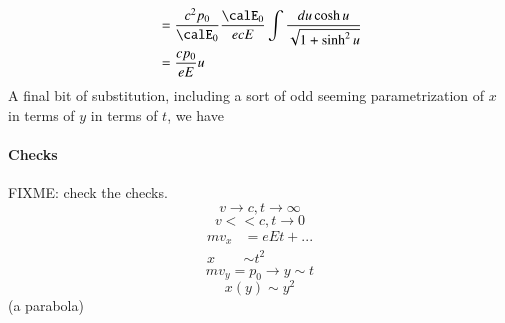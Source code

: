 {\begin{equation}
\begin{aligned}
&= \frac{c^2 p_0}{\calE_0}
\frac{\calE_0}{ e c E}
\int \frac{ du \cosh u }{\sqrt{1 + \sinh^2 u }} \\
&= \frac{c p_0}{ e E} u
\end{aligned}
\end{equation}
%
A final bit of substitution, including a sort of odd seeming parametrization of \(x\) in terms of \(y\) in terms of \(t\), we have
%
\paragraph{Checks}
%
FIXME: check the checks.
%
\begin{equation}\label{eqn:relativisticElectrodynamicsT3:420}
v \rightarrow c, t \rightarrow \infty
\end{equation}
%
\begin{equation}\label{eqn:relativisticElectrodynamicsT3:440}
v << c, t \rightarrow 0
\end{equation}
%
\begin{equation}\label{eqn:relativisticElectrodynamicsT3:990}
\begin{aligned}
m v_x &= e E t + ... \\
x &\sim t^2
\end{aligned}
\end{equation}
%
\begin{equation}\label{eqn:relativisticElectrodynamicsT3:460}
m v_y = p_0 \rightarrow y \sim t
\end{equation}
%
\begin{equation}\label{eqn:relativisticElectrodynamicsT3:480}
x(y) \sim y^2
\end{equation}
%
(a parabola)
%
}
